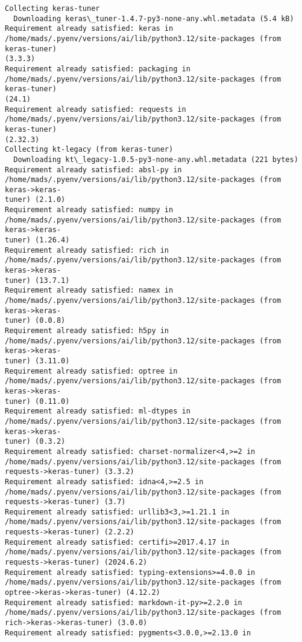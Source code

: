 \documentclass[12pt letter]{report}
\begin{document}
    \begin{Verbatim}[commandchars=\\\{\}]
Collecting keras-tuner
  Downloading keras\_tuner-1.4.7-py3-none-any.whl.metadata (5.4 kB)
Requirement already satisfied: keras in
/home/mads/.pyenv/versions/ai/lib/python3.12/site-packages (from keras-tuner)
(3.3.3)
Requirement already satisfied: packaging in
/home/mads/.pyenv/versions/ai/lib/python3.12/site-packages (from keras-tuner)
(24.1)
Requirement already satisfied: requests in
/home/mads/.pyenv/versions/ai/lib/python3.12/site-packages (from keras-tuner)
(2.32.3)
Collecting kt-legacy (from keras-tuner)
  Downloading kt\_legacy-1.0.5-py3-none-any.whl.metadata (221 bytes)
Requirement already satisfied: absl-py in
/home/mads/.pyenv/versions/ai/lib/python3.12/site-packages (from keras->keras-
tuner) (2.1.0)
Requirement already satisfied: numpy in
/home/mads/.pyenv/versions/ai/lib/python3.12/site-packages (from keras->keras-
tuner) (1.26.4)
Requirement already satisfied: rich in
/home/mads/.pyenv/versions/ai/lib/python3.12/site-packages (from keras->keras-
tuner) (13.7.1)
Requirement already satisfied: namex in
/home/mads/.pyenv/versions/ai/lib/python3.12/site-packages (from keras->keras-
tuner) (0.0.8)
Requirement already satisfied: h5py in
/home/mads/.pyenv/versions/ai/lib/python3.12/site-packages (from keras->keras-
tuner) (3.11.0)
Requirement already satisfied: optree in
/home/mads/.pyenv/versions/ai/lib/python3.12/site-packages (from keras->keras-
tuner) (0.11.0)
Requirement already satisfied: ml-dtypes in
/home/mads/.pyenv/versions/ai/lib/python3.12/site-packages (from keras->keras-
tuner) (0.3.2)
Requirement already satisfied: charset-normalizer<4,>=2 in
/home/mads/.pyenv/versions/ai/lib/python3.12/site-packages (from
requests->keras-tuner) (3.3.2)
Requirement already satisfied: idna<4,>=2.5 in
/home/mads/.pyenv/versions/ai/lib/python3.12/site-packages (from
requests->keras-tuner) (3.7)
Requirement already satisfied: urllib3<3,>=1.21.1 in
/home/mads/.pyenv/versions/ai/lib/python3.12/site-packages (from
requests->keras-tuner) (2.2.2)
Requirement already satisfied: certifi>=2017.4.17 in
/home/mads/.pyenv/versions/ai/lib/python3.12/site-packages (from
requests->keras-tuner) (2024.6.2)
Requirement already satisfied: typing-extensions>=4.0.0 in
/home/mads/.pyenv/versions/ai/lib/python3.12/site-packages (from
optree->keras->keras-tuner) (4.12.2)
Requirement already satisfied: markdown-it-py>=2.2.0 in
/home/mads/.pyenv/versions/ai/lib/python3.12/site-packages (from
rich->keras->keras-tuner) (3.0.0)
Requirement already satisfied: pygments<3.0.0,>=2.13.0 in

\end{Verbatim}
\end{document}
